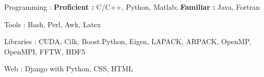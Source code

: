 


\begin{cvskills}


\cvskill
{Programming : } %
{\textbf{Proficient :}  C/C++, Python, Matlab; 
  \textbf{Familiar :} Java, Fortran} %

\cvskill
{Tools : }
{Bash, Perl, Awk, Latex}

\cvskill
{Libraries : }
{CUDA, Cilk, Boost.Python, Eigen, LAPACK, ARPACK, OpenMP, OpenMPI, FFTW, HDF5}


\cvskill
{Web : } %
{Django with Python, CSS, HTML} %




\end{cvskills}